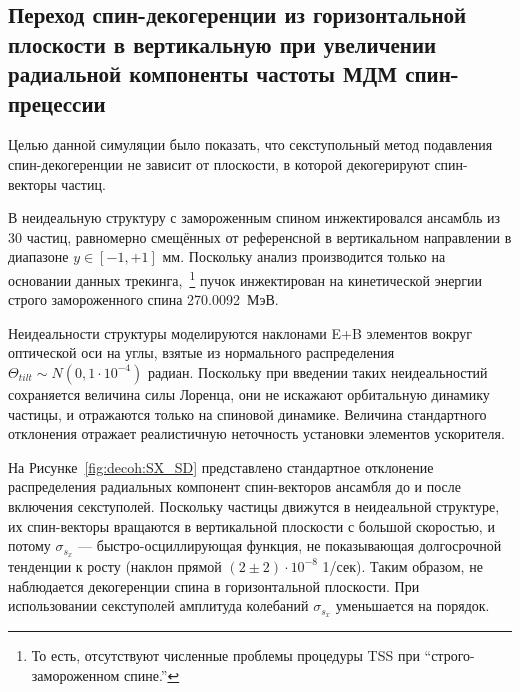 \subsection{Переход спин-декогеренции из горизонтальной плоскости в вертикальную при увеличении радиальной компоненты частоты МДМ спин-прецессии}\label{sec:Decoherence-plane-transfer}
Целью данной симуляции было показать, что секступольный метод подавления спин-декогеренции
не зависит от плоскости, в которой декогерируют спин-векторы частиц.

В неидеальную структуру с замороженным спином инжектировался ансамбль из 30 частиц, равномерно смещённых 
от референсной в вертикальном направлении в диапазоне ${y \in [-1, +1]}$ мм. 
Поскольку анализ производится только
на основании данных трекинга,~\footnote{То есть, отсутствуют численные проблемы процедуры TSS  
	при ``строго-замороженном спине.''} пучок инжектирован на кинетической энергии строго замороженного спина
270.0092~МэВ.

Неидеальности структуры моделируются наклонами E+B элементов вокруг оптической оси на углы, 
взятые из нормального распределения ${\Theta_{tilt} \sim N(0, 1\cdot 10^{-4})}$ радиан. 
Поскольку при введении таких неидеальностий сохраняется величина силы Лоренца, они не искажают 
орбитальную динамику частицы, и отражаются только на спиновой динамике. Величина стандартного отклонения
отражает реалистичную неточность установки элементов ускорителя. 

На Рисунке~\ref{fig:decoh:SX_SD} представлено стандартное отклонение распределения 
радиальных компонент спин-векторов ансамбля
до и после включения секступолей. Поскольку частицы движутся в неидеальной структуре, их спин-векторы вращаются
в вертикальной плоскости с большой скоростью, и потому $\sigma_{s_x}$ --- быстро-осциллирующая функция, не
показывающая долгосрочной тенденции к росту (наклон прямой $(2\pm2)\cdot 10^{-8}$ 1/сек). Таким образом, 
не наблюдается декогеренции спина в горизонтальной плоскости. При использовании секступолей 
амплитуда колебаний $\sigma_{s_x}$ уменьшается на порядок.

